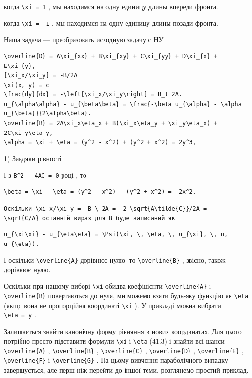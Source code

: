 \documentclass[
  ukrainian,
]{article}
\begin{document}
когда \texttt{\textbackslash{}xi\ =\ 1} , мы находимся на одну единицу
длины впереди фронта.

когда \texttt{\textbackslash{}xi\ =\ -1} , мы находимся на одну единицу
длины позади фронта.

Наша задача --- преобразовать исходную задачу с НУ

\begin{verbatim}
\overline{D} = A\xi_{xx} + B\xi_{xy} + C\xi_{yy} + D\xi_{x} + E\xi_{y},
[\xi_x/\xi_y] = -B/2A
\xi(x, y) = c
\frac{dy}{dx} = -\left[\xi_x/\xi_y\right] = B_t 2A.
u_{\alpha\alpha} - u_{\beta\beta} = \frac{-\beta u_{\alpha} - \alpha u_{\beta}}{2\alpha\beta}.
\overline{B} = 2A\xi_x\eta_x + B(\xi_x\eta_y + \xi_y\eta_x) + 2C\xi_y\eta_y,
\alpha = \xi + \eta = (y^2 - x^2) + (y^2 + x^2) = 2y^3,
\end{verbatim}

1) Завдяки рівності

І з \texttt{B\^{}2\ -\ 4AC\ =\ 0} році , то

\begin{verbatim}
\beta = \xi - \eta = (y^2 - x^2) - (y^2 + x^2) = -2x^2.
\end{verbatim}

\texttt{Оскільки\ \textquotesingle{}\textbackslash{}xi\_x/\textbackslash{}xi\_y\ =\ -B\ \textbackslash{}\ 2A\ =\ -2\ \textbackslash{}sqrt\{A\textbackslash{}tilde\{C\}\}/2A\ =\ -\textbackslash{}sqrt\{C/A\}\textquotesingle{}\ останній\ вираз\ для\ B\ буде\ записаний\ як}

\begin{verbatim}
u_{\xi\xi} - u_{\eta\eta} = \Psi(\xi, \, \eta, \, u_{\xi}, \, u, u_{\eta}).
\end{verbatim}

І оскільки \texttt{\textbackslash{}overline\{A\}} дорівнює нулю, то
\texttt{\textbackslash{}overline\{B\}} , звісно, також дорівнює нулю.

Оскільки при нашому виборі \texttt{\textbackslash{}xi} обидва
коефіцієнти \texttt{\textbackslash{}overline\{A\}} і
\texttt{\textbackslash{}overline\{B\}} повертаються до нуля, ми можемо
взяти будь-яку функцію як \texttt{\textbackslash{}eta} (якщо вона не
пропорційна координаті \texttt{\textbackslash{}xi} ). У прикладі можна
вибрати \texttt{\textbackslash{}eta\ =\ y} .

Залишається знайти канонічну форму рівняння в нових координатах. Для
цього потрібно просто підставити формули \texttt{\textbackslash{}xi} і
\texttt{\textbackslash{}eta} (41.3) і знайти всі шанси
\texttt{\textbackslash{}overline\{A\}} ,
\texttt{\textbackslash{}overline\{B\}} ,
\texttt{\textbackslash{}overline\{C\}} ,
\texttt{\textbackslash{}overline\{D\}} ,
\texttt{\textbackslash{}overline\{E\}} ,
\texttt{\textbackslash{}overline\{F\}} і
\texttt{\textbackslash{}overline\{G\}} . На цьому вивчення параболічного
випадку завершується, але перш ніж перейти до іншої теми, розглянемо
простий приклад.
\end{document}
